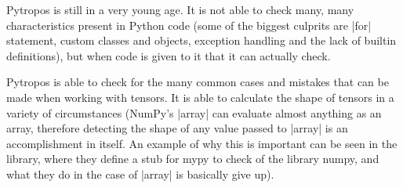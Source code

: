 


Pytropos is still in a very young age. It is not able to check many,
many characteristics present in Python code (some of the biggest
culprits are \pycode|for| statement, custom classes and objects,
exception handling and the lack of builtin definitions), but when code
is given to it that it can actually check.

Pytropos is able to check for the many common cases and mistakes that
can be made when working with tensors. It is able to calculate the shape
of tensors in a variety of circumstances (NumPy's \pycode|array| can
evaluate almost anything as an array, therefore detecting the shape of
any value passed to \pycode|array| is an accomplishment in itself. An
example of why this is important can be seen in the library{}, where they define a stub for mypy to check of
the library numpy, and what they do in the case of \pycode|array| is
basically give up).

